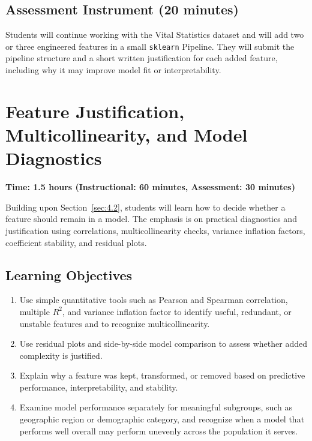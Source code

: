 \subsection{Assessment Instrument (20 minutes)}

Students will continue working with the Vital Statistics dataset
and will add two or three engineered features in a small
\verb|sklearn| Pipeline. They will submit the pipeline structure
and a short written justification for each added feature, including
why it may improve model fit or interpretability.

\section{Feature Justification, Multicollinearity, and Model
Diagnostics}
\label{sec:4.3}

\textbf{Time: 1.5 hours (Instructional: 60 minutes, Assessment:
30 minutes)}

\noindent Building upon Section~\ref{sec:4.2}, students will learn
how to decide whether a feature should remain in a model. The
emphasis is on practical diagnostics and justification using
correlations, multicollinearity checks, variance inflation factors,
coefficient stability, and residual plots.

\subsection{Learning Objectives}

\begin{enumerate}
    \item Use simple quantitative tools such as Pearson and Spearman
    correlation, multiple $R^2$, and variance inflation factor to
    identify useful, redundant, or unstable features and to recognize
    multicollinearity.
    \item Use residual plots and side-by-side model comparison to
    assess whether added complexity is justified.
    \item Explain why a feature was kept, transformed, or removed
    based on predictive performance, interpretability, and stability.
    \item Examine model performance separately for meaningful
    subgroups, such as geographic region or demographic category, and
    recognize when a model that performs well overall may perform
    unevenly across the population it serves.
\end{enumerate}

